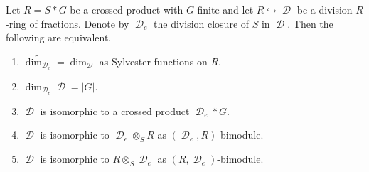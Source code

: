 \documentclass[10pt,a4paper]{amsart}
\DeclareMathOperator{\D}{\mathcal D}
\begin{document}
\begin{pro}\label{carnatural} Let $R=S*G$ be a crossed product with $G$ finite and let $R\hookrightarrow \D$ be a division  $R$-ring of fractions. Denote by $\D_e$ the division closure of $S$ in $\D$. Then the following are equivalent.

\begin{enumerate}
\item[(a)] $\widetilde{\dim_{\D_e}}=\dim_{\D}$ as Sylvester functions on $R$.
\item [(b)] $\dim_{\D_e} \D= |G|$.
\item[(c)]$\D$ is isomorphic to a crossed product $\D_e*G$.
\item[(d)] $\D$ is isomorphic to $\D_e\otimes_ S R$ as $(\D_e , R)$-bimodule.
\item [(e)]  $\D$ is isomorphic to $R\otimes_ S \D_e$ as $(  R,\D_e)$-bimodule.
\end{enumerate}


\end{pro}
\end{document}
